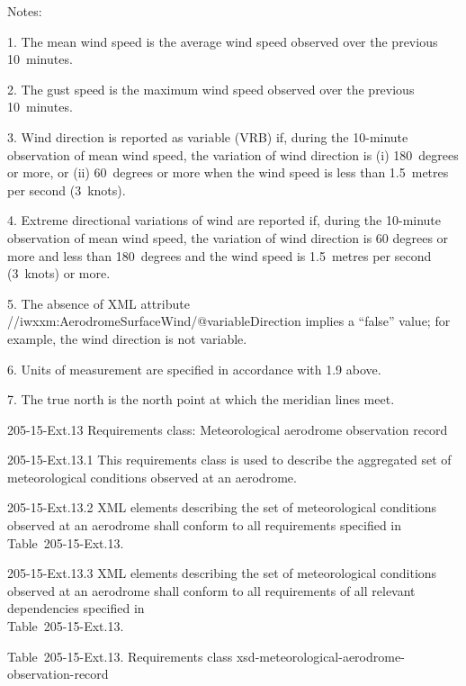 Notes:

1. The mean wind speed is the average wind speed observed over the previous 10~minutes.

2. The gust speed is the maximum wind speed observed over the previous 10~minutes.

3. Wind direction is reported as variable (VRB) if, during the 10-minute observation of mean wind speed, the variation of wind direction is (i) 180~degrees or more, or (ii) 60~degrees or more when the wind speed is less than 1.5~metres per second (3~knots).

4. Extreme directional variations of wind are reported if, during the 10-minute observation of mean wind speed, the variation of wind direction is 60 degrees or more and less than 180~degrees and the wind speed is 1.5~metres per second (3~knots) or more.

5. The absence of XML attribute //iwxxm:AerodromeSurfaceWind/@variableDirection implies a ``false'' value; for example, the wind direction is not variable.

6. Units of measurement are specified in accordance with 1.9 above.

7. The true north is the north point at which the meridian lines meet.

205-15-Ext.13 Requirements class: Meteorological aerodrome observation record

205-15-Ext.13.1 This requirements class is used to describe the aggregated set of meteorological conditions observed at an aerodrome.

205-15-Ext.13.2 XML elements describing the set of meteorological conditions observed at an aerodrome shall conform to all requirements specified in Table~205-15-Ext.13.

205-15-Ext.13.3 XML elements describing the set of meteorological conditions observed at an aerodrome shall conform to all requirements of all relevant dependencies specified in\\
Table~205-15-Ext.13.

Table~205-15-Ext.13. Requirements class xsd-meteorological-aerodrome-observation-record

